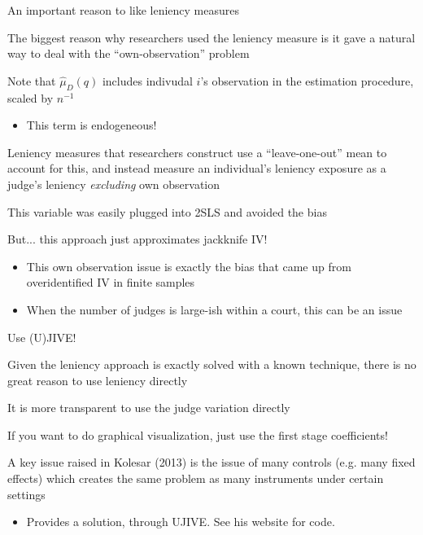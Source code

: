 \documentclass[notes,11pt, aspectratio=169]{beamer}
\newenvironment{wideitemize}{\itemize\addtolength{\itemsep}{10pt}}{\enditemize}
\begin{document}
\begin{frame}{An important reason to like leniency measures}
  \begin{wideitemize}
  \item The biggest reason why researchers used the leniency measure
    is it gave a natural way to deal with the ``own-observation''
    problem
  \item Note that $\hat{\mu}_{D}(q)$ includes indivudal $i$'s
    observation in the estimation procedure, scaled by $n^{-1}$
    \begin{itemize}
    \item This term is endogeneous!
    \end{itemize}
  \item Leniency measures that researchers construct use a
    ``leave-one-out'' mean to account for this, and instead measure an
    individual's leniency exposure as a judge's leniency
    \emph{excluding} own observation
  \item This variable was easily plugged into 2SLS and avoided the bias
  \item But... this approach just approximates jackknife IV!
    \begin{itemize}
    \item This own observation issue is exactly the bias that came up from overidentified IV in finite samples
    \item When the number of judges is large-ish within a court, this
      can be an issue
    \end{itemize}
  \end{wideitemize}
\end{frame}


\begin{frame}{Use (U)JIVE!}
  \begin{wideitemize}
  \item Given the leniency approach is exactly solved with a known technique, there is
    no great reason to use leniency directly
  \item It is more transparent to use the judge variation directly
  \item If you want to do graphical visualization, just use the first stage coefficients!
  \item A key issue raised in Kolesar (2013) is the issue of many controls (e.g. many fixed effects) which creates the same problem as many instruments under certain settings
    \begin{itemize}
    \item Provides a solution, through UJIVE. See his website for
      code.
    \end{itemize}
  \end{wideitemize}
\end{frame}
\end{document}
